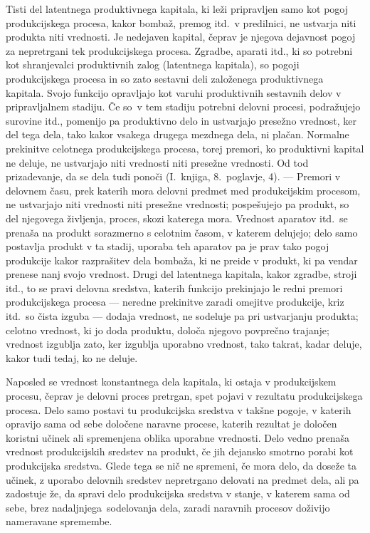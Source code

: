 \documentclass[kapital_02.tex]{subfiles}
\begin{document}
Tisti del latentnega produktivnega kapitala, ki leži pripravljen samo kot pogoj produkcijskega procesa, kakor bombaž, premog itd.\ v predilnici, ne ustvarja niti produkta niti vrednosti.
Je nedejaven kapital, čeprav je njegova dejavnost pogoj za nepretrgani tek produkcijskega procesa.
Zgradbe, aparati itd., ki so potrebni kot shranjevalci produktivnih zalog (latentnega kapitala), so pogoji produkcijskega procesa in so zato sestavni deli založenega produktivnega kapitala.
Svojo funkcijo opravljajo kot varuhi produktivnih sestavnih delov v pripravljalnem stadiju. 
Če so\KPEstran\ v tem stadiju potrebni delovni procesi, podražujejo surovine itd., pomenijo pa produktivno delo in ustvarjajo presežno vrednost, ker del tega dela, tako kakor vsakega drugega mezdnega dela, ni plačan. 
Normalne prekinitve celotnega produkcijskega procesa, torej premori, ko produktivni kapital ne deluje, ne ustvarjajo niti vrednosti niti presežne vrednosti. 
Od tod prizadevanje, da se dela tudi ponoči (I.\ knjiga, 8.\ poglavje, 4).
 — Premori v delovnem času, prek katerih mora delovni predmet 
med produkcijskim procesom, ne ustvarjajo niti vrednosti niti presežne vrednosti; pospešujejo pa produkt, so del njegovega življenja, proces, skozi katerega mora.
Vrednost aparatov itd.\ se prenaša na produkt sorazmerno s celotnim časom, v katerem delujejo; delo samo postavlja produkt v ta stadij, uporaba teh aparatov pa je prav tako pogoj produkcije kakor razprašitev dela bombaža, ki ne preide v produkt, ki pa vendar prenese nanj svojo vrednost.
Drugi del latentnega kapitala, kakor zgradbe, stroji itd., to se pravi delovna sredstva, katerih funkcijo prekinjajo le redni premori produkcijskega procesa — neredne prekinitve zaradi omejitve produkcije, kriz itd.\ so čista izguba — dodaja vrednost, ne sodeluje pa pri ustvarjanju produkta; celotno vrednost, ki jo doda produktu, določa njegovo povprečno trajanje; vrednost izgublja zato, ker izgublja uporabno vrednost, tako takrat, kadar deluje, kakor tudi tedaj, ko ne deluje.

Naposled se vrednost konstantnega dela kapitala, ki ostaja v produkcijskem procesu, čeprav je delovni proces pretrgan, spet pojavi v rezultatu produkcijskega procesa.
Delo samo postavi tu produkcijska sredstva v takšne pogoje, v katerih opravijo sama od sebe določene naravne procese, katerih rezultat je določen koristni učinek ali spremenjena oblika uporabne vrednosti.
Delo vedno prenaša vrednost produkcijskih sredstev na produkt, če jih dejansko smotrno porabi kot produkcijska sredstva.
Glede tega se nič ne spremeni, če mora delo, da doseže ta učinek, z uporabo delovnih sredstev nepretrgano delovati na predmet dela, ali pa zadostuje že, da spravi delo produkcijska sredstva v stanje, v katerem sama od sebe, brez nadaljnjega\KPEstran\ sodelovanja dela, zaradi naravnih procesov doživijo nameravane spremembe.
\end{document}
